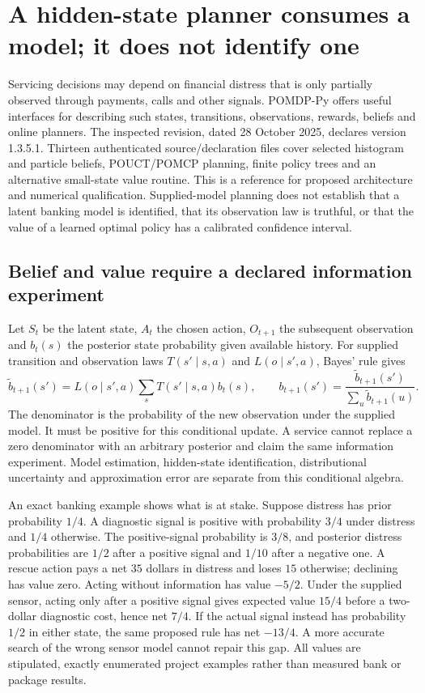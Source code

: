 \section{A hidden-state planner consumes a model; it does not identify one}
\label{exec23:pomdppy-scope}
Servicing decisions may depend on financial distress that is only partially
observed through payments, calls and other signals. POMDP-Py offers useful
interfaces for describing such states, transitions, observations, rewards,
beliefs and online planners. The inspected revision, dated 28 October 2025,
declares version 1.3.5.1. Thirteen authenticated source/declaration files cover
selected histogram and particle beliefs, POUCT/POMCP planning, finite policy
trees and an alternative small-state value routine. This is a reference for
proposed architecture and numerical qualification. Supplied-model planning
does not establish that a latent banking model is identified, that its observation
law is truthful, or that the value of a learned optimal policy has a calibrated
confidence interval. \citep{exec23_pomdppy_sources}

\subsection{Belief and value require a declared information experiment}
\label{exec23:pomdppy-belief}
Let $S_t$ be the latent state, $A_t$ the chosen action, $O_{t+1}$ the subsequent
observation and $b_t(s)$ the posterior state probability given available
history. For supplied transition and observation laws $T(s'\mid s,a)$ and
$L(o\mid s',a)$, Bayes' rule gives
\[
 \widetilde b_{t+1}(s')=L(o\mid s',a)\sum_sT(s'\mid s,a)b_t(s),
 \qquad b_{t+1}(s')=\frac{\widetilde b_{t+1}(s')}
 {\sum_u\widetilde b_{t+1}(u)}.
\]
The denominator is the probability of the new observation under the supplied
model. It must be positive for this conditional update. A service cannot
replace a zero denominator with an arbitrary posterior and claim the same
information experiment. Model estimation, hidden-state identification,
distributional uncertainty and approximation error are separate from this
conditional algebra.

An exact banking example shows what is at stake. Suppose distress has prior
probability $1/4$. A diagnostic signal is positive with probability $3/4$ under
distress and $1/4$ otherwise. The positive-signal probability is $3/8$, and
posterior distress probabilities are $1/2$ after a positive signal and $1/10$
after a negative one. A rescue action pays a net $35$ dollars in distress and
loses $15$ otherwise; declining has value zero. Acting without information has
value $-5/2$. Under the supplied sensor, acting only after a positive signal
gives expected value $15/4$ before a two-dollar diagnostic cost, hence net
$7/4$. If the actual signal instead has probability $1/2$ in either state,
the same proposed rule has net $-13/4$. A more accurate search of the wrong
sensor model cannot repair this gap. All values are stipulated, exactly
enumerated project examples rather than measured bank or package results.
\citep{exec23_pomdppy_reference}

